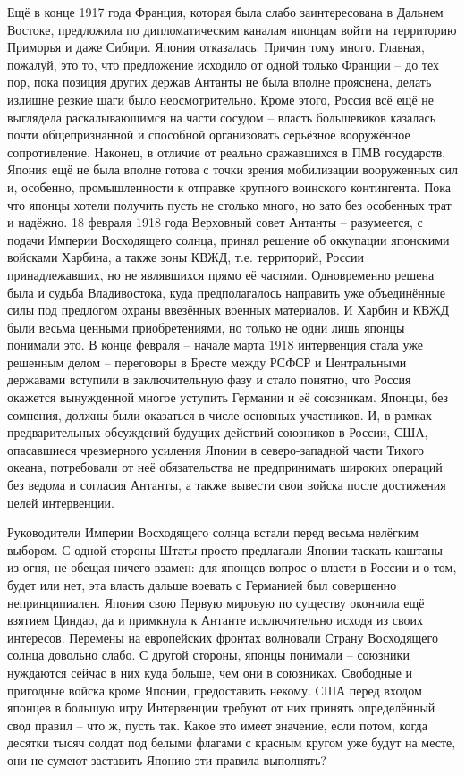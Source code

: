 Ещё в конце 1917 года Франция, которая была слабо заинтересована в Дальнем Востоке, предложила по дипломатическим каналам японцам войти на территорию Приморья и даже Сибири. Япония отказалась. Причин тому много. Главная, пожалуй, это то, что предложение исходило от одной только Франции – до тех пор, пока позиция других держав Антанты не была вполне прояснена, делать излишне резкие шаги было неосмотрительно. Кроме этого, Россия всё ещё не выглядела раскалывающимся на части сосудом – власть большевиков казалась почти общепризнанной и способной организовать серьёзное вооружённое сопротивление. Наконец, в отличие от реально сражавшихся в ПМВ государств, Япония ещё не была вполне готова с точки зрения мобилизации вооруженных сил и, особенно, промышленности к отправке крупного воинского контингента. Пока что японцы хотели получить пусть не столько много, но зато без особенных трат и надёжно. 18 февраля 1918 года Верховный совет Антанты – разумеется, с подачи Империи Восходящего солнца, принял решение об оккупации японскими войсками Харбина, а также зоны КВЖД, т.е. территорий, России принадлежавших, но не являвшихся прямо её частями. Одновременно решена была и судьба Владивостока, куда предполагалось направить уже объединённые силы под предлогом охраны ввезённых военных материалов. И Харбин и КВЖД были весьма ценными приобретениями, но только не одни лишь японцы понимали это. В конце февраля – начале марта 1918 интервенция стала уже решенным делом – переговоры в Бресте между РСФСР и Центральными державами вступили в заключительную фазу и стало понятно, что Россия окажется вынужденной многое уступить Германии и её союзникам. Японцы, без сомнения, должны были оказаться в числе основных участников. И, в рамках предварительных обсуждений будущих действий союзников в России, США, опасавшиеся чрезмерного усиления Японии в северо-западной части Тихого океана, потребовали от неё обязательства не предпринимать широких операций без ведома и согласия Антанты, а также вывести свои войска после достижения целей интервенции.

Руководители Империи Восходящего солнца встали перед весьма нелёгким выбором. С одной стороны Штаты просто предлагали Японии таскать каштаны из огня, не обещая ничего взамен: для японцев вопрос о власти в России и о том, будет или нет, эта власть дальше воевать с Германией был совершенно непринципиален. Япония свою Первую мировую по существу окончила ещё взятием Циндао, да и примкнула к Антанте исключительно исходя из своих интересов. Перемены на европейских фронтах волновали Страну Восходящего солнца довольно слабо. С другой стороны, японцы понимали – союзники нуждаются сейчас в них куда больше, чем они в союзниках. Свободные и пригодные войска кроме Японии, предоставить некому. США перед входом японцев в большую игру Интервенции требуют от них принять определённый свод правил – что ж, пусть так. Какое это имеет значение, если потом, когда десятки тысяч солдат под белыми флагами с красным кругом уже будут на месте, они не сумеют заставить Японию эти правила выполнять?

